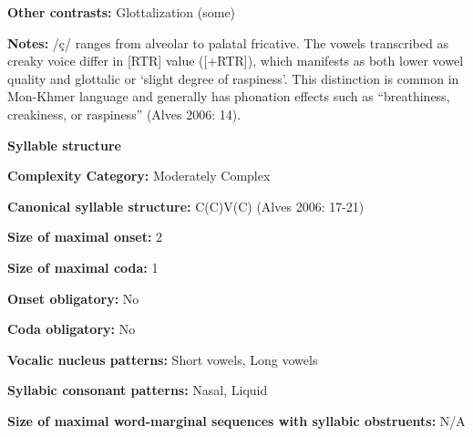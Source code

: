 \begin{styleBody}
\textbf{Other contrasts:} Glottalization (some)
\end{styleBody}

\begin{styleBody}
\textbf{Notes:} /ç/ ranges from alveolar to palatal fricative. The vowels transcribed as creaky voice differ in [RTR] value ([+RTR]), which manifests as both lower vowel quality and glottalic or ‘slight degree of raspiness’. This distinction is common in Mon-Khmer language and generally has phonation effects such as “breathiness, creakiness, or raspiness” (Alves 2006: 14).
\end{styleBody}

\begin{styleBody}
\textbf{Syllable structure}
\end{styleBody}

\begin{styleBody}
\textbf{Complexity Category: }Moderately Complex
\end{styleBody}

\begin{styleBody}
\textbf{Canonical syllable structure:} C(C)V(C)\textbf{ }(Alves 2006: 17-21)
\end{styleBody}

\begin{styleBody}
\textbf{Size of maximal onset:} 2
\end{styleBody}

\begin{styleBody}
\textbf{Size of maximal coda:} 1
\end{styleBody}

\begin{styleBody}
\textbf{Onset obligatory:} No
\end{styleBody}

\begin{styleBody}
\textbf{Coda obligatory:} No
\end{styleBody}

\begin{styleBody}
\textbf{Vocalic nucleus patterns:} Short vowels, Long vowels
\end{styleBody}

\begin{styleBody}
\textbf{Syllabic consonant patterns:} Nasal, Liquid
\end{styleBody}

\begin{styleBody}
\textbf{Size of maximal word{}-marginal sequences with syllabic obstruents:} N/A
\end{styleBody}

